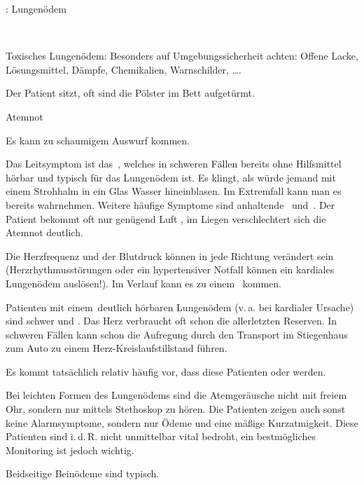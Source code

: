 \clearpage %
\TextSlide
{\TxABCDE: Lungenödem}
{~
\begin{ABCDEText}
  \item[\ABCDE{1}] Toxisches Lungenödem: Besonders auf
  Umgebungssicherheit achten: Offene Lacke,
  Lösungsmittel, Dämpfe, Chemikalien, Warnschilder, \ldots.
  \item[\ABCDE{2}] Der Patient sitzt, oft sind die Pölster
  im Bett aufgetürmt.
  \item[\ABCDE{4}] Atemnot
  \item[\ABCDE{A}] Es kann zu schaumigem Auswurf kommen.
  \item[\ABCDE{B}] %
  Das Leitsymptom ist das
  {\RedFlag}\,, welches in
  schweren Fällen bereits ohne Hilfsmittel hörbar und
  typisch für das Lungenödem ist. Es klingt, als würde jemand
  mit einem Strohhalm in ein Glas Wasser hineinblasen. Im
  Extremfall kann man es bereits  wahrnehmen.
  Weitere häufige Symptome sind anhaltende {\RedFlag}\, und
  {\RedFlag}\,.
  Der Patient bekommt oft nur  genügend
  Luft , im Liegen verschlechtert sich die
  Atemnot deutlich.
  \item[\ABCDE{C}] Die Herzfrequenz und der Blutdruck können
  in jede Richtung verändert sein (Herzrhythmusstörungen
  oder ein hypertensiver Notfall können ein kardiales
  Lungenödem auslösen!). Im Verlauf kann es zu einem
  {\RedFlag}\, kommen.
  \item[\ABCDE{=}] Patienten mit einem {\RedFlag}\,deutlich
  hörbaren Lungenödem (v.\,a. bei kardialer Ursache) sind schwer und . Das Herz verbraucht oft schon die allerletzten Reserven. In
  schweren Fällen kann schon die Aufregung durch den Transport
  im Stiegenhaus zum Auto zu einem Herz-Kreislaufstillstand
  führen.
  
  Es kommt tatsächlich relativ häufig vor, dass diese
  Patienten  oder 
   werden. 
  
  Bei leichten Formen des Lungenödems sind die
  Atemgeräusche nicht mit freiem Ohr, sondern
  nur mittels Stethoskop zu hören.  Die Patienten zeigen auch
  sonst keine Alarmsymptome, sondern nur Ödeme und eine mäßige
  Kurzatmigkeit. Diese Patienten sind i.\,d.\,R. nicht
  unmittelbar vital bedroht, ein bestmögliches Monitoring ist jedoch wichtig.
  \item[\ABCDE{\ldots}] Beidseitige Beinödeme sind typisch.
\end{ABCDEText}
}
